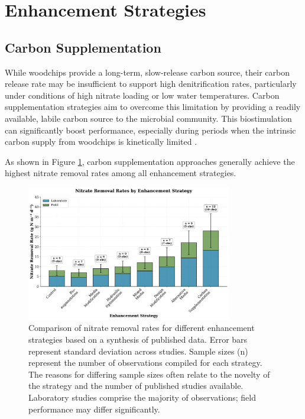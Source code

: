 \documentclass[12pt,a4paper]{article}
\begin{document}
\section{Enhancement Strategies}

\subsection{Carbon Supplementation}

While woodchips provide a long-term, slow-release carbon source, their carbon release rate may be insufficient to support high denitrification rates, particularly under conditions of high nitrate loading or low water temperatures. Carbon supplementation strategies aim to overcome this limitation by providing a readily available, labile carbon source to the microbial community. This biostimulation can significantly boost performance, especially during periods when the intrinsic carbon supply from woodchips is kinetically limited \citep{RN242}.

As shown in Figure \ref{fig:removal_rates_by_strategy}, carbon supplementation approaches generally achieve the highest nitrate removal rates among all enhancement strategies.

\begin{figure}[ht]
\centering
\includegraphics[width=0.8\textwidth]{fig1_removal_rates_scientific}
\caption{Comparison of nitrate removal rates for different enhancement strategies based on a synthesis of published data. Error bars represent standard deviation across studies. Sample sizes (n) represent the number of observations compiled for each strategy. The reasons for differing sample sizes often relate to the novelty of the strategy and the number of published studies available. Laboratory studies comprise the majority of observations; field performance may differ significantly.}
\label{fig:removal_rates_by_strategy}
\end{figure}
\end{document}

